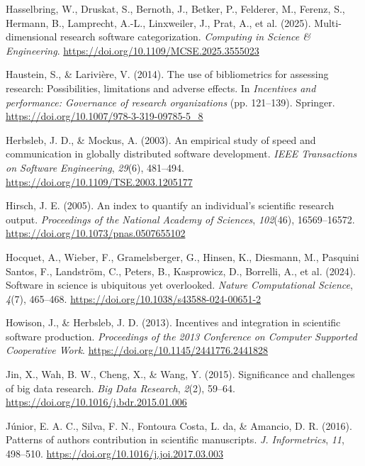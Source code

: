 \documentclass[
  number,
  3p,
  onecolumn]{elsarticle}
\newlength{\cslhangindent}
\newenvironment{CSLReferences}[2] %
 {\begin{list}{}{%
  \setlength{\itemindent}{0pt}
  \setlength{\leftmargin}{0pt}
  \setlength{\parsep}{0pt}
  \ifodd #1
   \setlength{\leftmargin}{\cslhangindent}
   \setlength{\itemindent}{-1\cslhangindent}
  \fi
  \setlength{\itemsep}{#2\baselineskip}}}
 {\end{list}}
\begin{document}
\begin{CSLReferences}{1}{0}
Hasselbring, W., Druskat, S., Bernoth, J., Betker, P., Felderer, M.,
Ferenz, S., Hermann, B., Lamprecht, A.-L., Linxweiler, J., Prat, A., et
al. (2025). Multi-dimensional research software categorization.
\emph{Computing in Science \& Engineering}.
\url{https://doi.org/10.1109/MCSE.2025.3555023}

Haustein, S., \& Larivière, V. (2014). The use of bibliometrics for
assessing research: Possibilities, limitations and adverse effects. In
\emph{Incentives and performance: Governance of research organizations}
(pp. 121--139). Springer.
\url{https://doi.org/10.1007/978-3-319-09785-5_8}

Herbsleb, J. D., \& Mockus, A. (2003). An empirical study of speed and
communication in globally distributed software development. \emph{IEEE
Transactions on Software Engineering}, \emph{29}(6), 481--494.
\url{https://doi.org/10.1109/TSE.2003.1205177}

Hirsch, J. E. (2005). An index to quantify an individual's scientific
research output. \emph{Proceedings of the National Academy of Sciences},
\emph{102}(46), 16569--16572.
\url{https://doi.org/10.1073/pnas.0507655102}

Hocquet, A., Wieber, F., Gramelsberger, G., Hinsen, K., Diesmann, M.,
Pasquini Santos, F., Landström, C., Peters, B., Kasprowicz, D.,
Borrelli, A., et al. (2024). Software in science is ubiquitous yet
overlooked. \emph{Nature Computational Science}, \emph{4}(7), 465--468.
\url{https://doi.org/10.1038/s43588-024-00651-2}

Howison, J., \& Herbsleb, J. D. (2013). Incentives and integration in
scientific software production. \emph{Proceedings of the 2013 Conference
on Computer Supported Cooperative Work}.
\url{https://doi.org/10.1145/2441776.2441828}

Jin, X., Wah, B. W., Cheng, X., \& Wang, Y. (2015). Significance and
challenges of big data research. \emph{Big Data Research}, \emph{2}(2),
59--64. \url{https://doi.org/10.1016/j.bdr.2015.01.006}

Júnior, E. A. C., Silva, F. N., Fontoura Costa, L. da, \& Amancio, D. R.
(2016). Patterns of authors contribution in scientific manuscripts.
\emph{J. Informetrics}, \emph{11}, 498--510.
\url{https://doi.org/10.1016/j.joi.2017.03.003}


\end{CSLReferences}
\end{document}
